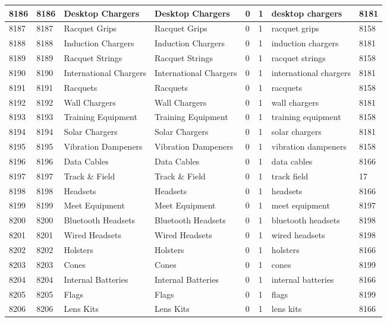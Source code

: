 \begin{longtable}{|l|l|l|l|l|l|l|l|}
8186 & 8186 & Desktop Chargers & Desktop Chargers & 0 & 1 & desktop chargers & 8181 \\ \hline 
8187 & 8187 & Racquet Grips & Racquet Grips & 0 & 1 & racquet grips & 8158 \\ \hline 
8188 & 8188 & Induction Chargers & Induction Chargers & 0 & 1 & induction chargers & 8181 \\ \hline 
8189 & 8189 & Racquet Strings & Racquet Strings & 0 & 1 & racquet strings & 8158 \\ \hline 
8190 & 8190 & International Chargers & International Chargers & 0 & 1 & international chargers & 8181 \\ \hline 
8191 & 8191 & Racquets & Racquets & 0 & 1 & racquets & 8158 \\ \hline 
8192 & 8192 & Wall Chargers & Wall Chargers & 0 & 1 & wall chargers & 8181 \\ \hline 
8193 & 8193 & Training Equipment & Training Equipment & 0 & 1 & training equipment & 8158 \\ \hline 
8194 & 8194 & Solar Chargers & Solar Chargers & 0 & 1 & solar chargers & 8181 \\ \hline 
8195 & 8195 & Vibration Dampeners & Vibration Dampeners & 0 & 1 & vibration dampeners & 8158 \\ \hline 
8196 & 8196 & Data Cables & Data Cables & 0 & 1 & data cables & 8166 \\ \hline 
8197 & 8197 & Track \& Field & Track \& Field & 0 & 1 & track field & 17 \\ \hline 
8198 & 8198 & Headsets & Headsets & 0 & 1 & headsets & 8166 \\ \hline 
8199 & 8199 & Meet Equipment & Meet Equipment & 0 & 1 & meet equipment & 8197 \\ \hline 
8200 & 8200 & Bluetooth Headsets & Bluetooth Headsets & 0 & 1 & bluetooth headsets & 8198 \\ \hline 
8201 & 8201 & Wired Headsets & Wired Headsets & 0 & 1 & wired headsets & 8198 \\ \hline 
8202 & 8202 & Holsters & Holsters & 0 & 1 & holsters & 8166 \\ \hline 
8203 & 8203 & Cones & Cones & 0 & 1 & cones & 8199 \\ \hline 
8204 & 8204 & Internal Batteries & Internal Batteries & 0 & 1 & internal batteries & 8166 \\ \hline 
8205 & 8205 & Flags & Flags & 0 & 1 & flags & 8199 \\ \hline 
8206 & 8206 & Lens Kits & Lens Kits & 0 & 1 & lens kits & 8166 \\ \hline 

\end{longtable}
